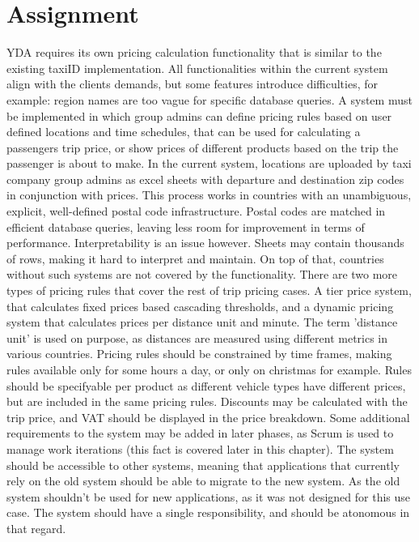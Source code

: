 \section{Assignment}
YDA requires its own pricing calculation functionality that is similar to the existing taxiID implementation. All functionalities within the current system align with the clients demands, but some features introduce difficulties, for example: region names are too vague for specific database queries. A system must be implemented in which group admins can define pricing rules based on user defined locations and time schedules, that can be used for calculating a passengers trip price, or show prices of different products based on the trip the passenger is about to make. In the current system, locations are uploaded by taxi company group admins as excel sheets with departure and destination zip codes in conjunction with prices. This process works in countries with an unambiguous, explicit, well-defined postal code infrastructure. Postal codes are matched in efficient database queries, leaving less room for improvement in terms of performance. Interpretability is an issue however. Sheets may contain thousands of rows, making it hard to interpret and maintain. On top of that, countries without such systems are not covered by the functionality. There are two more types of pricing rules that cover the rest of trip pricing cases. A tier price system, that calculates fixed prices based cascading thresholds, and a dynamic pricing system that calculates prices per distance unit and minute. The term 'distance unit' is used on purpose, as distances are measured using different metrics in various countries. Pricing rules should be constrained by time frames, making rules available only for some hours a day, or only on christmas for example. Rules should be specifyable per product as different vehicle types have different prices, but are included in the same pricing rules. Discounts may be calculated with the trip price, and VAT should be displayed in the price breakdown. Some additional requirements to the system may be added in later phases, as Scrum is used to manage work iterations (this fact is covered later in this chapter). The system should be accessible to other systems, meaning that applications that currently rely on the old system should be able to migrate to the new system. As the old system shouldn't be used for new applications, as it was not designed for this use case. The system should have a single responsibility, and should be atonomous in that regard.

